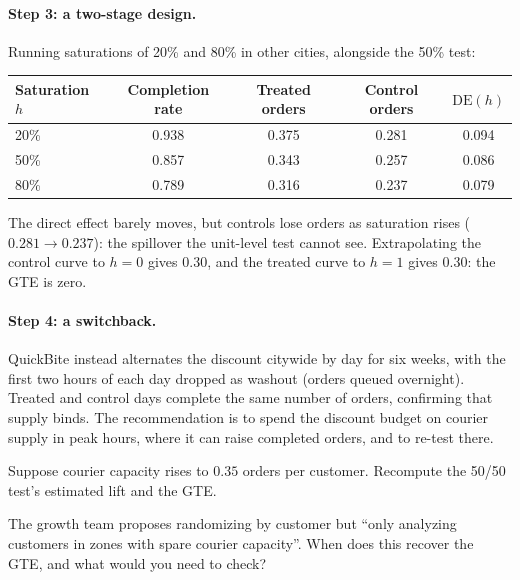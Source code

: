 \documentclass[11pt]{article}
\begin{document}
\paragraph{Step 3: a two-stage design.} Running saturations of 20\% and 80\% in other cities, alongside the 50\% test:
\begin{center}
\begin{tabular}{lcccc}
\toprule
Saturation $h$ & Completion rate & Treated orders & Control orders & $\text{DE}(h)$ \\
\midrule
20\% & 0.938 & 0.375 & 0.281 & 0.094 \\
50\% & 0.857 & 0.343 & 0.257 & 0.086 \\
80\% & 0.789 & 0.316 & 0.237 & 0.079 \\
\bottomrule
\end{tabular}
\end{center}
The direct effect barely moves, but controls lose orders as saturation rises ($0.281 \to 0.237$): the spillover the
unit-level test cannot see. Extrapolating the control curve to $h = 0$ gives $0.30$, and the treated curve to $h = 1$
gives $0.30$: the GTE is zero.

\paragraph{Step 4: a switchback.} QuickBite instead alternates the discount citywide by day for six weeks, with the first
two hours of each day dropped as washout (orders queued overnight). Treated and control days complete the same number
of orders, confirming that supply binds. The recommendation is to spend the discount budget on courier supply in
peak hours, where it can raise completed orders, and to re-test there.

\begin{exercise}[computation]
Suppose courier capacity rises to $0.35$ orders per customer. Recompute the 50/50 test's estimated lift and the GTE.
\end{exercise}

\begin{exercise}[judgment]
The growth team proposes randomizing by customer but ``only analyzing customers in zones with spare courier
capacity''. When does this recover the GTE, and what would you need to check?
\end{exercise}
\end{document}
